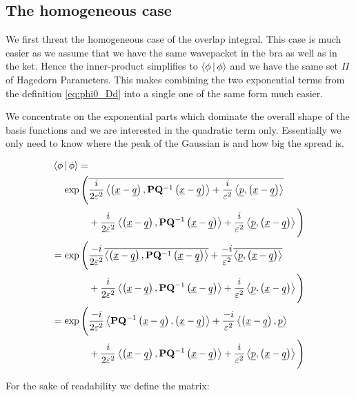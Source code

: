 \subsection{The homogeneous case}


We first threat the homogeneous case of the overlap integral. This case is
much easier as we assume that we have the same wavepacket in the bra as well
as in the ket. Hence the inner-product simplifies to $\Braket{\phi|\phi}$
and we have the same set $\Pi$ of Hagedorn Parameters. This makes combining
the two exponential terms from the definition \eqref{eq:phi0_Dd} into a single one
of the same form much easier.

We concentrate on the exponential parts which dominate the overall shape of the
basis functions and we are interested in the quadratic term only. Essentially we
only need to know where the peak of the Gaussian is and how big the spread is.

\begin{align*}
  \Braket{\phi|\phi} = & \\
  \exp\Bigg( &
      \overline{\frac{i}{2\varepsilon^2} \left\langle \left( \underline{x}-\underline{q} \right) , \mathbf{P} \mathbf{Q}{}^{-1} \left( \underline{x}-\underline{q} \right) \right\rangle
      + \frac{i}{\varepsilon^2} \left\langle \underline{p} , \left( \underline{x}-\underline{q} \right) \right\rangle}
      \\
    & + \frac{i}{2\varepsilon^2} \left\langle \left( \underline{x}-\underline{q} \right) , \mathbf{P} \mathbf{Q}{}^{-1} \left( \underline{x}-\underline{q} \right) \right\rangle
      + \frac{i}{\varepsilon^2} \left\langle \underline{p} , \left( \underline{x}-\underline{q} \right) \right\rangle
  \Bigg) \\
  = \exp\Bigg( &
      \frac{-i}{2\varepsilon^2} \overline{\left\langle \left( \underline{x}-\underline{q} \right) , \mathbf{P} \mathbf{Q}{}^{-1} \left( \underline{x}-\underline{q} \right) \right\rangle}
      + \frac{-i}{\varepsilon^2} \overline{\left\langle \underline{p} , \left( \underline{x}-\underline{q} \right) \right\rangle}
      \\
    & + \frac{i}{2\varepsilon^2} \left\langle \left( \underline{x}-\underline{q} \right) , \mathbf{P} \mathbf{Q}{}^{-1} \left( \underline{x}-\underline{q} \right) \right\rangle
      + \frac{i}{\varepsilon^2} \left\langle \underline{p} , \left( \underline{x}-\underline{q} \right) \right\rangle
  \Bigg) \\
  = \exp\Bigg( &
      \frac{-i}{2\varepsilon^2} \left\langle \mathbf{P} \mathbf{Q}{}^{-1} \left( \underline{x}-\underline{q} \right) , \left( \underline{x}-\underline{q} \right) \right\rangle
      + \frac{-i}{\varepsilon^2} \left\langle \left( \underline{x}-\underline{q} \right) , \underline{p} \right\rangle
      \\
    & + \frac{i}{2\varepsilon^2} \left\langle \left( \underline{x}-\underline{q} \right) , \mathbf{P} \mathbf{Q}{}^{-1} \left( \underline{x}-\underline{q} \right) \right\rangle
      + \frac{i}{\varepsilon^2} \left\langle \underline{p} , \left( \underline{x}-\underline{q} \right) \right\rangle
  \Bigg)
\end{align*}

For the sake of readability we define the matrix:

